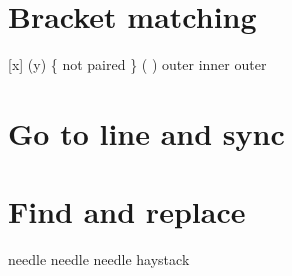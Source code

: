 \documentclass{article}
\begin{document}
\section{Bracket matching}
 [x] (y) \{ not paired \} \left(  \right) {outer {inner} outer}

\section{Go to line and sync}

\section{Find and replace}
needle needle needle
haystack
\end{document}

